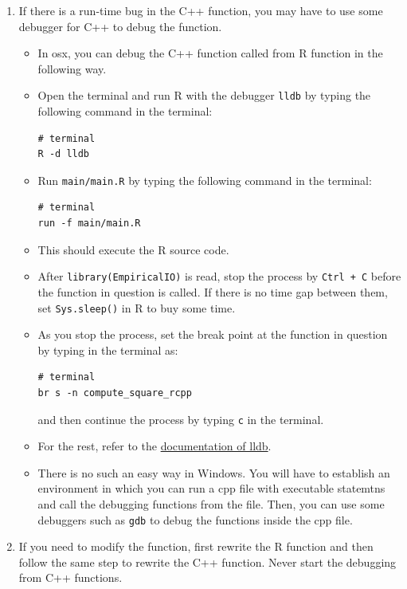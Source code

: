\documentclass[]{book}
\providecommand{\tightlist}{%
  \setlength{\itemsep}{0pt}\setlength{\parskip}{0pt}}
\begin{document}
\begin{enumerate}
\def\labelenumi{\arabic{enumi}.}
\setcounter{enumi}{11}
\tightlist
\item
  If there is a run-time bug in the C++ function, you may have to use
  some debugger for C++ to debug the function.

  \begin{itemize}
  \item
    In osx, you can debug the C++ function called from R function in the
    following way.
  \item
    Open the terminal and run R with the debugger \texttt{lldb} by
    typing the following command in the terminal:

\begin{verbatim}
# terminal
R -d lldb
\end{verbatim}
  \item
    Run \texttt{main/main.R} by typing the following command in the
    terminal:

\begin{verbatim}
# terminal
run -f main/main.R
\end{verbatim}
  \item
    This should execute the R source code.
  \item
    After \texttt{library(EmpiricalIO)} is read, stop the process by
    \texttt{Ctrl\ +\ C} before the function in question is called. If
    there is no time gap between them, set \texttt{Sys.sleep()} in R to
    buy some time.
  \item
    As you stop the process, set the break point at the function in
    question by typing in the terminal as:

\begin{verbatim}
# terminal
br s -n compute_square_rcpp
\end{verbatim}

    and then continue the process by typing \texttt{c} in the terminal.
  \item
    For the rest, refer to the
    \href{https://lldb.llvm.org/}{documentation of lldb}.
  \item
    There is no such an easy way in Windows. You will have to establish
    an environment in which you can run a cpp file with executable
    statemtns and call the debugging functions from the file. Then, you
    can use some debuggers such as \texttt{gdb} to debug the functions
    inside the cpp file.
  \end{itemize}
\item
  If you need to modify the function, first rewrite the R function and
  then follow the same step to rewrite the C++ function. Never start the
  debugging from C++ functions.
\end{enumerate}
\end{document}
